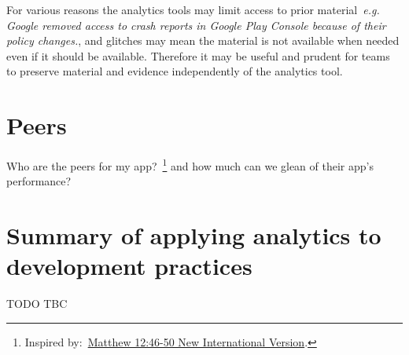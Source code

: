 For various reasons the analytics tools may limit access to prior material~\emph{e.g. Google removed access to crash reports in Google Play Console because of their policy changes.}, and glitches may mean the material is not available when needed even if it should be available. Therefore it may be useful and prudent for teams to preserve material and evidence independently of the analytics tool. 

\section{Peers}
Who are the peers for my app?~\footnote{Inspired by:~\href{https://www.biblegateway.com/passage/?search=Matthew\%2012:46-50&version=NIV}{Matthew 12:46-50 New International Version}.} and how much can we glean of their app's performance?


\section{Summary of applying analytics to development practices}
TODO TBC
